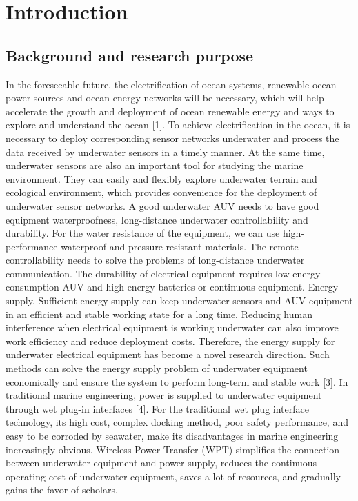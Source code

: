 \chapter{Introduction}
\section{Background and research purpose}
In the foreseeable future, the electrification of ocean systems, renewable ocean power sources and ocean energy networks will be necessary, which will help accelerate the growth and deployment of ocean renewable energy and ways to explore and understand the ocean [1]. To achieve electrification in the ocean, it is necessary to deploy corresponding sensor networks underwater and process the data received by underwater sensors in a timely manner. At the same time, underwater sensors are also an important tool for studying the marine environment. They can easily and flexibly explore underwater terrain and ecological environment, which provides convenience for the deployment of underwater sensor networks. A good underwater AUV needs to have good equipment waterproofness, long-distance underwater controllability and durability. For the water resistance of the equipment, we can use high-performance waterproof and pressure-resistant materials. The remote controllability needs to solve the problems of long-distance underwater communication. The durability of electrical equipment requires low energy consumption AUV and high-energy batteries or continuous equipment. Energy supply. Sufficient energy supply can keep underwater sensors and AUV equipment in an efficient and stable working state for a long time. Reducing human interference when electrical equipment is working underwater can also improve work efficiency and reduce deployment costs. Therefore, the energy supply for underwater electrical equipment has become a novel research direction. Such methods can solve the energy supply problem of underwater equipment economically and ensure the system to perform long-term and stable work [3]. In traditional marine engineering, power is supplied to underwater equipment through wet plug-in interfaces [4]. For the traditional wet plug interface technology, its high cost, complex docking method, poor safety performance, and easy to be corroded by seawater, make its disadvantages in marine engineering increasingly obvious. Wireless Power Transfer (WPT) simplifies the connection between underwater equipment and power supply, reduces the continuous operating cost of underwater equipment, saves a lot of resources, and gradually gains the favor of scholars.

